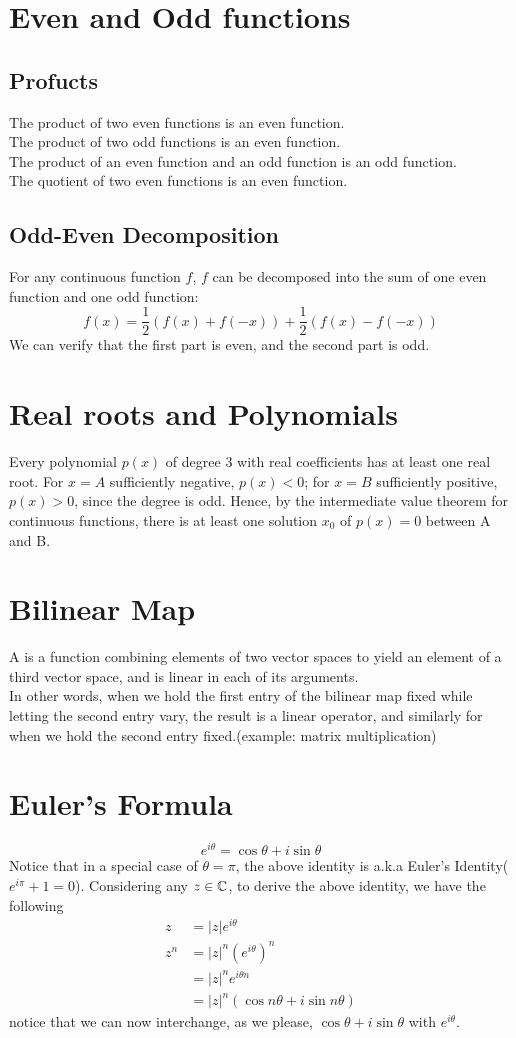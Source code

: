 \documentclass[11pt]{article}
\begin{document}
\section{Even and Odd functions}
\subsection{Profucts}
The product of two even functions is an even function. \\
The product of two odd functions is an even function. \\
The product of an even function and an odd function is an odd function.\\
The quotient of two even functions is an even function.
\subsection{Odd-Even Decomposition}
For any continuous function $f$, $f$ can be decomposed into the sum of one even function and one odd function:
$$f(x) = \frac{1}{2}(f(x) + f(-x)) + \frac{1}{2}(f(x) - f(-x))$$
We can verify that the first part is even, and the second part is odd.
\section{Real roots and Polynomials}
Every polynomial $p(x)$ of degree 3 with real coefficients has at least one real root. For $x = A$ sufficiently negative, $p(x) < 0$; for $x = B$ sufficiently positive, $p(x) > 0$, since the degree is odd. Hence, by the intermediate value theorem for continuous functions, there is at least one solution $x_0$ of $p(x) = 0$ between A and B.
\section{Bilinear Map}
A  is a function combining elements of two vector spaces to yield an element of a third vector space, and is linear in each of its arguments. \\
In other words, when we hold the first entry of the bilinear map fixed while letting the second entry vary, the result is a linear operator, and similarly for when we hold the second entry fixed.(example: matrix multiplication)
\section{Euler's Formula}
$$e^{i\theta} = \cos \theta + i\sin \theta$$
    Notice that in a special case of $\theta = \pi$, the above identity is a.k.a Euler's 
    Identity($e^{i\pi}+1=0$). Considering any $z\in \mathbb{C}$, to derive the above identity, we have the following
    \begin{align*}
    	z &= |z|e^{i\theta}\\
        z^n &= |z|^n\left(e^{i\theta}\right)^n\\
        &= |z|^ne^{i\theta n} \\
        &= |z|^n\left(\cos n\theta + i\sin n \theta\right)
    \end{align*}
    notice that we can now interchange, as we please, $\cos \theta + i\sin \theta$ with $e^{i\theta}$.
\end{document}
